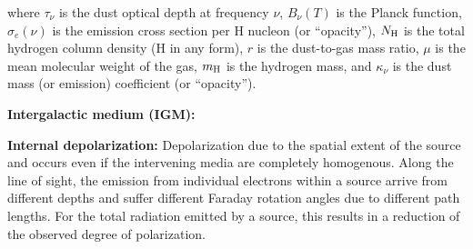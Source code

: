 \documentclass[a4paper,10pt]{article}
\begin{document}
{\noindent}where $\tau_\nu$ is the dust optical depth at frequency $\nu$, $B_\nu(T)$ is the Planck function, $\sigma_e(\nu)$ is the emission cross section per H nucleon (or ``opacity''), $N_{\rm H}$ is the total hydrogen column density (H in any form), $r$ is the dust-to-gas mass ratio, $\mu$ is the mean molecular weight of the gas, $m_{\rm H}$ is the hydrogen mass, and $\kappa_\nu$ is the dust mass (or emission) coefficient (or ``opacity'').

{\noindent}\textbf{Intergalactic medium (IGM):} 

{\noindent}\textbf{Internal depolarization:} Depolarization due to the spatial extent of the source and occurs even if the intervening media are completely homogenous. Along the line of sight, the emission from individual electrons within a source arrive from different depths and suffer different Faraday rotation angles due to different path lengths. For the total radiation emitted by a source, this results in a reduction of the observed degree of polarization.
\end{document}
